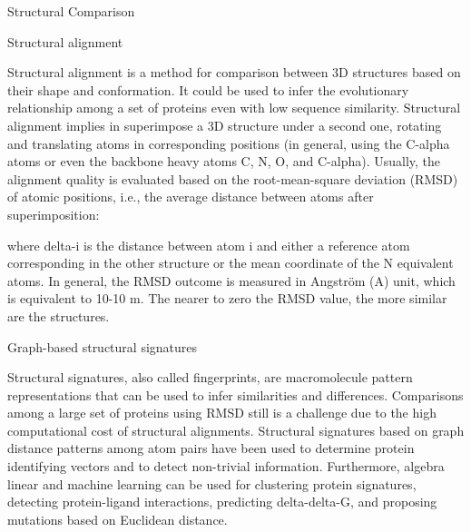 Structural Comparison

Structural alignment

Structural alignment is a method for comparison between 3D structures based on their shape and conformation. It could be used to infer the evolutionary relationship among a set of proteins even with low sequence similarity. Structural alignment implies in superimpose a 3D structure under a second one, rotating and translating atoms in corresponding positions (in general, using the C-alpha atoms or even the backbone heavy atoms C, N, O, and C-alpha). Usually, the alignment quality is evaluated based on the root-mean-square deviation (RMSD) of atomic positions, i.e., the average distance between atoms after superimposition:

where delta-i is the distance between atom i and either a reference atom corresponding in the other structure or the mean coordinate of the N equivalent atoms. In general, the RMSD outcome is measured in Angström (A) unit, which is equivalent to 10-10 m. The nearer to zero the RMSD value, the more similar are the structures.

Graph-based structural signatures

Structural signatures, also called fingerprints, are macromolecule pattern representations that can be used to infer similarities and differences. Comparisons among a large set of proteins using RMSD still is a challenge due to the high computational cost of structural alignments. Structural signatures based on graph distance patterns among atom pairs have been used to determine protein identifying vectors and to detect non-trivial information. Furthermore, algebra linear and machine learning can be used for clustering protein signatures, detecting protein-ligand interactions, predicting delta-delta-G, and proposing mutations based on Euclidean distance.
